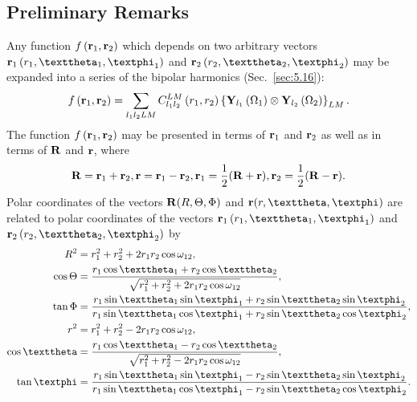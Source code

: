 \subsection{Preliminary Remarks}\label{sec:5.17.1}
Any function $f\left(\mathbf{r}_{1}, \mathbf{r}_{2}\right)$ which depends on two arbitrary vectors $\vect{r}_{1}\left(r_{1}, \vartheta_{1}, \varphi_{1}\right)$ and $\vect{r}_{2}\left(r_{2}, \vartheta_{2}, \varphi_{2}\right)$ may be expanded into a series of the bipolar harmonics (Sec.~\ref{sec:5.16}):
\begin{equation}
f\left(\mathbf{r}_{1}, \mathbf{r}_{2}\right)=\sum_{l_{1} l_{2} L M} C_{l_{1} l_{2}}^{L M}\left(r_{1}, r_{2}\right)\left\{\mathbf{Y}_{l_{1}}\left(\Omega_{1}\right) \otimes \mathbf{Y}_{l_{2}}\left(\Omega_{2}\right)\right\}_{L M}. \label{eq:5:17:1}
\end{equation}
The function $f\left(\mathbf{r}_{1}, \mathbf{r}_{2}\right)$ may be presented in terms of $\mathbf{r}_{1}$ and $\mathbf{r}_{2}$ as well as in terms of $\mathbf{R}$ and $\mathbf{r}$, where
\begin{equation}
\mathbf{R}=\mathbf{r}_{1}+\mathbf{r}_{2}, \mathbf{r}=\mathbf{r}_{1}-\mathbf{r}_{2}, \mathbf{r}_{1}=\frac{1}{2}(\mathbf{R}+\mathbf{r}), \mathbf{r}_{2}=\frac{1}{2}(\mathbf{R}-\mathbf{r}). \label{eq:5:17:2}
\end{equation}
Polar coordinates of the vectors $\mathbf{R}(R, \Theta, \Phi)$ and $\vect{r}(r, \vartheta, \varphi)$ are related to polar coordinates of the vectors $\vect{r}_{1}\left(r_{1}, \vartheta_{1}, \varphi_{1}\right)$ and $\vect{r}_{2}\left(r_{2}, \vartheta_{2}, \varphi_{2}\right)$ by
\begin{align}
R^{2} & =r_{1}^{2}+r_{2}^{2}+2 r_{1} r_{2} \cos \omega_{12},  \notag\\
\cos \Theta & =\frac{r_{1} \cos \vartheta_{1}+r_{2} \cos \vartheta_{2}}{\sqrt{r_{1}^{2}+r_{2}^{2}+2 r_{1} r_{2} \cos \omega_{12}}},  \notag\\
\tan \Phi & =\frac{r_{1} \sin \vartheta_{1} \sin \varphi_{1}+r_{2} \sin \vartheta_{2} \sin \varphi_{2}}{r_{1} \sin \vartheta_{1} \cos \varphi_{1}+r_{2} \sin \vartheta_{2} \cos \varphi_{2}},  \notag\\
r^{2} & =r_{1}^{2}+r_{2}^{2}-2 r_{1} r_{2} \cos \omega_{12},  \label{eq:5:17:3}\\
\cos \vartheta & =\frac{r_{1} \cos \vartheta_{1}-r_{2} \cos \vartheta_{2}}{\sqrt{r_{1}^{2}+r_{2}^{2}-2 r_{1} r_{2} \cos \omega_{12}}},  \notag\\
\tan \varphi & =\frac{r_{1} \sin \vartheta_{1} \sin \varphi_{1}-r_{2} \sin \vartheta_{2} \sin \varphi_{2}}{r_{1} \sin \vartheta_{1} \cos \varphi_{1}-r_{2} \sin \vartheta_{2} \cos \varphi_{2}} . \notag
\end{align}
